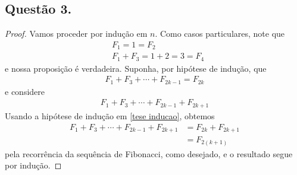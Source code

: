 \documentclass[a4paper,12pt]{article}
\theoremstyle{definition}
\begin{document}
\subsection*{Questão 3.}
\begin{proof}
	Vamos proceder por indução em $n$. Como casos particulares, note que
	\begin{align*}
	&F_1 = 1 = F_2 \\
	&F_1 + F_3 = 1 + 2 = 3 = F_4
	\end{align*}
	e nossa proposição é verdadeira. Suponha, por hipótese de indução, que 
	\begin{align*}
	F_1 + F_3 + \cdots + F_{2k-1} = F_{2k}
	\end{align*}
	e considere
	\begin{align}
	\label{tese inducao}
	F_1 + F_3 + \cdots + F_{2k-1} + F_{2k+1}
	\end{align}
	Usando a hipótese de indução em \eqref{tese inducao}, obtemos
	\begin{align*}
	F_1 + F_3 + \cdots + F_{2k-1} + F_{2k+1} &= F_{2k} + F_{2k+1} \\
	&= F_{2(k+1)}
	\end{align*}
	pela recorrência da sequência de Fibonacci, como desejado, e o resultado segue por indução.
\end{proof}
	
	
	
	
	
	
	
	
	
	
	
	
	
	
\end{document}
